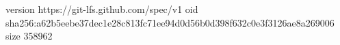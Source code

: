 version https://git-lfs.github.com/spec/v1
oid sha256:a62b5eebe37dec1e28c813fc71ee94d0d56b0d398f632c0e3f3126ae8a269006
size 358962
